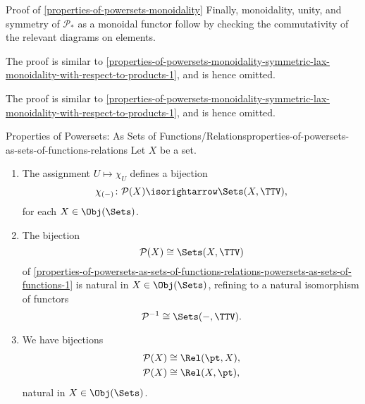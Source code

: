 \begin{Proof}{Proof of \cref{properties-of-powersets-monoidality}}
    Finally, monoidality, unity, and symmetry of $\mathcal{P}_{*}$ as a monoidal functor follow by checking the commutativity of the relevant diagrams on elements.

    The proof is similar to \cref{properties-of-powersets-monoidality-symmetric-lax-monoidality-with-respect-to-products-1}, and is hence omitted.

    The proof is similar to \cref{properties-of-powersets-monoidality-symmetric-lax-monoidality-with-respect-to-products-1}, and is hence omitted.
\end{Proof}
\begin{proposition}{Properties of Powersets: As Sets of Functions/Relations}{properties-of-powersets-as-sets-of-functions-relations}%
    Let $X$ be a set.
    \begin{enumerate}
        \item\label{properties-of-powersets-as-sets-of-functions-relations-powersets-as-sets-of-functions-1}The assignment $U\mapsto\chi_{U}$ defines a bijection%
            \[
                \chi_{(-)}
                \colon
                \mathcal{P}(X)
                \isorightarrow
                \Sets(X,\TTV),
            \]%
            for each $X\in\Obj(\Sets)$.
        \item\label{properties-of-powersets-as-sets-of-functions-relations-powersets-as-sets-of-functions-2}The bijection
            \[
                \mathcal{P}(X)%
                \cong%
                \Sets(X,\TTV)%
            \]%
            of \cref{properties-of-powersets-as-sets-of-functions-relations-powersets-as-sets-of-functions-1} is natural in $X\in\Obj(\Sets)$, refining to a natural isomorphism of functors
            \[
                \mathcal{P}^{-1}%
                \cong%
                \Sets(-,\TTV).%
            \]%
        \item\label{properties-of-powersets-as-sets-of-functions-relations-powersets-as-sets-of-relations}We have bijections
            \begin{align*}
                \mathcal{P}(X) &\cong \Rel(\pt,X),\\
                \mathcal{P}(X) &\cong \Rel(X,\pt),
            \end{align*}
            natural in $X\in\Obj(\Sets)$.
    \end{enumerate}
\end{proposition}
